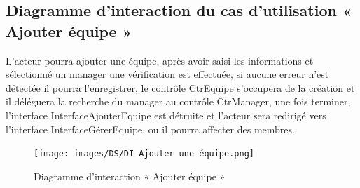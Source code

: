         \subsection*{Diagramme d'interaction du cas d'utilisation « Ajouter équipe »}
        L’acteur pourra ajouter une équipe, après avoir saisi les informations et sélectionné un manager une vérification est effectuée, si aucune erreur n’est détectée il pourra l’enregistrer, le contrôle CtrEquipe s’occupera de la création et il déléguera la recherche du manager au contrôle CtrManager, une fois terminer, l’interface InterfaceAjouterEquipe est détruite et l’acteur sera redirigé vers l’interface InterfaceGérerEquipe, ou il pourra affecter des membres.
        \clearpage
        \begin{figure}[h!]
                 \centering
                \texttt{[image: images/DS/DI Ajouter une équipe.png]}
                 \caption{Diagramme d'interaction « Ajouter équipe »}
                 \label{fig38}
        \end{figure}
        


